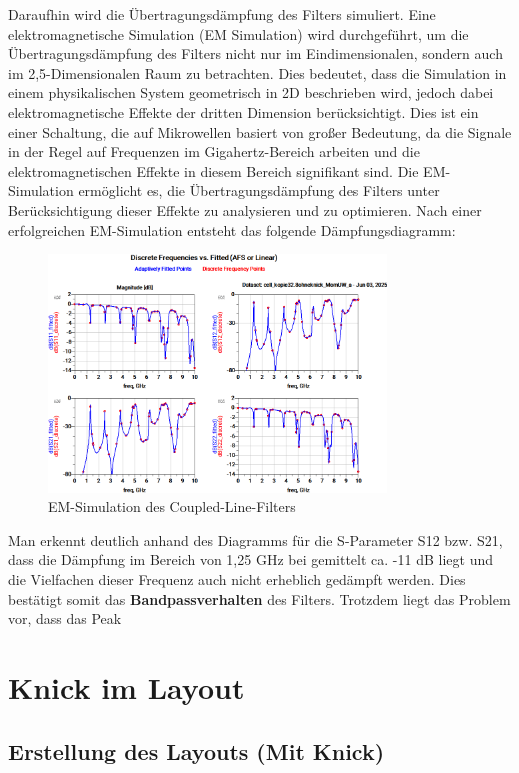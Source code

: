 Daraufhin wird die Übertragungsdämpfung des Filters simuliert. Eine elektromagnetische Simulation (EM Simulation) wird durchgeführt, um die Übertragungsdämpfung des Filters nicht nur im Eindimensionalen, sondern auch im 2,5-Dimensionalen Raum zu betrachten. 
Dies bedeutet, dass die Simulation in einem physikalischen System geometrisch in 2D beschrieben wird, jedoch dabei elektromagnetische Effekte der dritten Dimension berücksichtigt. 
Dies ist ein einer Schaltung, die auf Mikrowellen basiert von großer Bedeutung, da die Signale in der Regel auf Frequenzen im Gigahertz-Bereich arbeiten und die elektromagnetischen Effekte in diesem Bereich signifikant sind. 
Die EM-Simulation ermöglicht es, die Übertragungsdämpfung des Filters unter Berücksichtigung dieser Effekte zu analysieren und zu optimieren.
Nach einer erfolgreichen EM-Simulation entsteht das folgende Dämpfungsdiagramm:
\begin{figure}[H]
    \centering
    \includegraphics[width=0.8\textwidth]{Pictures/EMSimulationohneKnick.png}
    \caption{EM-Simulation des Coupled-Line-Filters}
\end{figure}

Man erkennt deutlich anhand des Diagramms für die S-Parameter S12 bzw. S21, dass die Dämpfung im Bereich von 1,25 GHz bei gemittelt ca. -11 dB liegt und die Vielfachen dieser Frequenz auch nicht erheblich gedämpft werden. Dies bestätigt somit das \textbf{Bandpassverhalten} des Filters.
Trotzdem liegt das Problem vor, dass das Peak 
\section{Knick im Layout}
    \subsection{Erstellung des Layouts (Mit Knick)}


